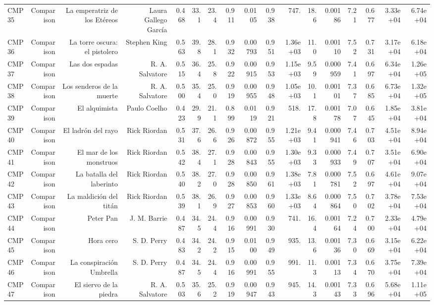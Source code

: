 \begin{table}[htbp]
\begin{tabular}{lrrrrrrrrrrrrrrrr}
CMP35 & Comparison & La emperatriz de los Etéreos & Laura Gallego García & 0.468 & 33.1 & 23.4 & 0.911 & 0.0105 & 0.938 & 747. & 18.6 & 0.00186 & 7.21 & 0.677 & 3.33e+04 & 6.74e+04 \\
CMP36 & Comparison & La torre oscura: el pistolero & Stephen King & 0.563 & 39.8 & 28.1 & 0.932 & 0.00793 & 0.951 & 1.36e+03 & 11.0 & 0.00110 & 7.52 & 0.731 & 3.17e+04 & 6.18e+04 \\
CMP37 & Comparison & Las dos espadas & R. A. Salvatore & 0.515 & 36.4 & 25.8 & 0.922 & 0.00915 & 0.953 & 1.15e+03 & 9.59 & 0.000959 & 7.41 & 0.697 & 6.34e+04 & 1.26e+05 \\
CMP38 & Comparison & Los senderos de la muerte & R. A. Salvatore & 0.500 & 35.4 & 25.0 & 0.919 & 0.00955 & 0.948 & 1.05e+03 & 10.1 & 0.00101 & 7.37 & 0.685 & 6.73e+04 & 1.32e+05 \\
CMP39 & Comparison & El alquimista & Paulo Coelho & 0.423 & 29.9 & 21.1 & 0.899 & 0.0119 & 0.921 & 518. & 17.8 & 0.00178 & 7.07 & 0.645 & 1.85e+04 & 3.81e+04 \\
CMP40 & Comparison & El ladrón del rayo & Rick Riordan & 0.531 & 37.6 & 26.6 & 0.926 & 0.00872 & 0.955 & 1.21e+03 & 9.41 & 0.000941 & 7.46 & 0.703 & 4.51e+04 & 8.94e+04 \\
CMP41 & Comparison & El mar de los monstruos & Rick Riordan & 0.542 & 38.4 & 27.1 & 0.928 & 0.00843 & 0.955 & 1.30e+03 & 9.33 & 0.000933 & 7.49 & 0.707 & 3.51e+04 & 6.90e+04 \\
CMP42 & Comparison & La batalla del laberinto & Rick Riordan & 0.540 & 38.2 & 27.0 & 0.928 & 0.00850 & 0.961 & 1.38e+03 & 7.81 & 0.000781 & 7.52 & 0.697 & 4.61e+04 & 9.07e+04 \\
CMP43 & Comparison & La maldición del titán & Rick Riordan & 0.539 & 38.1 & 26.9 & 0.927 & 0.00853 & 0.960 & 1.33e+03 & 8.64 & 0.000864 & 7.50 & 0.702 & 3.78e+04 & 7.53e+04 \\
CMP44 & Comparison & Peter Pan & J. M. Barrie & 0.487 & 34.5 & 24.4 & 0.916 & 0.00991 & 0.930 & 741. & 16.4 & 0.00164 & 7.24 & 0.700 & 2.33e+04 & 4.79e+04 \\
CMP45 & Comparison & Hora cero & S. D. Perry & 0.483 & 34.2 & 24.2 & 0.915 & 0.0100 & 0.949 & 935. & 13.6 & 0.00136 & 7.30 & 0.669 & 3.15e+04 & 6.22e+04 \\
CMP46 & Comparison & La conspiración Umbrella & S. D. Perry & 0.487 & 34.5 & 24.4 & 0.916 & 0.00991 & 0.955 & 991. & 11.3 & 0.00113 & 7.34 & 0.670 & 3.75e+04 & 7.39e+04 \\
CMP47 & Comparison & El siervo de la piedra & R. A. Salvatore & 0.503 & 35.6 & 25.2 & 0.919 & 0.00947 & 0.943 & 945. & 14.3 & 0.00143 & 7.33 & 0.696 & 5.68e+04 & 1.11e+05 \\

\end{tabular}
\end{table}
